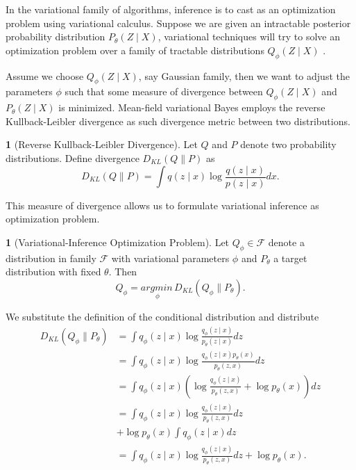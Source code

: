 \documentclass[11pt]{article}
\theoremstyle{plain}
\theoremstyle{definition}
\newtheorem{defn}[thm]{\protect\definitionname}
\theoremstyle{plain}
\providecommand{\definitionname}{Definition}
\begin{document}
In the variational family of algorithms, inference is to cast as an
optimization problem using variational calculus. Suppose we are given
an intractable posterior probability distribution $P_{\theta}(Z\mid X)$,
variational techniques will try to solve an optimization problem over
a family of tractable distributions $Q_{\phi}(Z\mid X)$ .

Assume we choose $Q_{\phi}(Z\mid X)$, say Gaussian family, then we
want to adjust the parameters $\phi$ such that some measure of divergence
between $Q_{\phi}(Z\mid X)$ and $P_{\theta}(Z\mid X)$ is minimized.
Mean-field variational Bayes employs the reverse Kullback-Leibler
divergence as such divergence metric between two distributions.
\begin{defn}[Reverse Kullback-Leibler Divergence]
Let $Q$ and $P$ denote two probability distributions. Define divergence
$D_{KL}(Q\rVert P)$ as
\begin{equation}
D_{KL}(Q\rVert P)=\int q(z\mid x)\log\frac{q(z\mid x)}{p(z\mid x)}dx.
\end{equation}
\end{defn}
This measure of divergence allows us to formulate variational inference
as optimization problem.
\begin{defn}[Variational-Inference Optimization Problem]
Let $Q_{\phi}\in\mathcal{F}$ denote a distribution in family $\mathcal{F}$
with variational parameters $\phi$ and $P_{\theta}$ a target distribution
with fixed $\theta$. Then
\begin{equation}
Q_{\phi}=\underset{\phi}{argmin\,}D_{KL}(Q_{\phi}\rVert P_{\theta}).\label{eq:var_opt_prob}
\end{equation}
\end{defn}
We substitute the definition of the conditional distribution and distribute\textit{
\begin{equation}
\begin{aligned}D_{KL}(Q_{\phi}\rVert P_{\theta}) & =\int q_{\phi}(z\mid x)\log\frac{q_{\phi}(z\mid x)}{p_{\theta}(z\mid x)}dz\\
 & =\int q_{\phi}(z\mid x)\log\frac{q_{\phi}(z\mid x)p_{\theta}(x)}{p_{\theta}(z,x)}dz\\
 & =\int q_{\phi}(z\mid x)\left(\log\frac{q_{\phi}(z\mid x)}{p_{\theta}(z,x)}+\log p_{\theta}(x)\right)dz\\
 & =\int q_{\phi}(z\mid x)\log\frac{q_{\phi}(z\mid x)}{p_{\theta}(z,x)}dz\\
 & +\log p_{\theta}(x)\int q_{\phi}(z\mid x)dz\\
 & =\int q_{\phi}(z\mid x)\log\frac{q_{\phi}(z\mid x)}{p_{\theta}(z,x)}dz+\log p_{\theta}(x).
\end{aligned}
\label{eq:var_kl_derive}
\end{equation}
}
\end{document}
